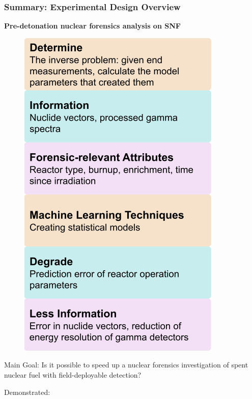 
\begin{frame}
  \frametitle{Summary: Experimental Design Overview}
  \begin{adjustwidth}{-15pt}{-10pt}
  \textbf{Pre-detonation nuclear forensics analysis on SNF}\\
  \vspace{2pt}
  \begin{minipage}{0.38\textwidth}
    \begin{figure}
      \centering
      \includegraphics[height=0.78\textheight]{./figures/overview.png}
    \end{figure}
  \end{minipage}%
  \hfill
  \begin{minipage}{0.65\textwidth}
    \begin{block}{Main Goal:}
      \small
      Is it possible to speed up a nuclear forensics investigation of spent
      nuclear fuel with field-deployable detection?
    \end{block}
    \vspace{-8pt}
    \begin{block}{Demonstrated:}

\end{block}
\end{minipage}
\end{adjustwidth}
\end{frame}
